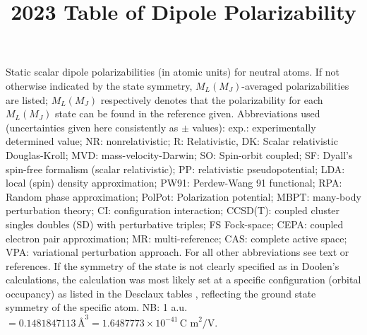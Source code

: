 \documentclass[journal=jctcce,manuscript=article,layout=traditional]{achemso}
\title{2023 Table of Dipole Polarizability}
\begin{document}
    Static scalar dipole polarizabilities (in atomic units) for neutral atoms.
    If not otherwise indicated by the state symmetry, $M_L (M_J)$-averaged polarizabilities are
    listed; $M_L (M_J)$ respectively denotes that the polarizability for each $M_L (M_J)$ state
    can be found in the reference given. Abbreviations used (uncertainties given here consistently
    as $\pm$ values): exp.: experimentally determined value; NR: nonrelativistic; R: Relativistic,
    DK: Scalar relativistic Douglas-Kroll; MVD: mass-velocity-Darwin; SO: Spin-orbit coupled;
    SF: Dyall's spin-free formalism (scalar relativistic); PP: relativistic pseudopotential;
    LDA: local (spin) density approximation; PW91: Perdew-Wang 91 functional;
    RPA: Random phase approximation; PolPot: Polarization potential; MBPT: many-body
    perturbation theory; CI: configuration interaction; CCSD(T): coupled cluster singles
    doubles (SD) with perturbative triples; FS Fock-space; CEPA: coupled electron pair
    approximation; MR: multi-reference; CAS: complete active space; VPA: variational perturbation
    approach. For all other abbreviations see text or references. If the symmetry of the state
    is not clearly specified as in Doolen's calculations, the calculation was most likely set
    at a specific configuration (orbital occupancy) as listed in the Desclaux tables
    , reflecting the ground state symmetry of the specific atom.
    NB: 1 a.u. $= 0.1481847113 \, \text{\AA}^3 = 1.6487773 \times 10^{-41} \,
    \text{C m}^2/\text{V}$.

    

    
\end{document}
